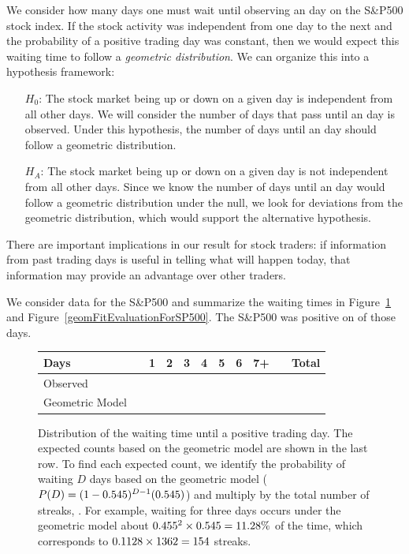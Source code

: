We consider how many days one must wait until observing an  day on the S\&P500 stock index. If the stock activity was independent from one day to the next and the probability of a positive trading day was constant, then we would expect this waiting time to follow a \emph{geometric distribution}. We can organize this into a hypothesis framework:
\begin{itemize}
\item[$H_0$:] The stock market being up or down on a given day is independent from all other days. We will consider the number of days that pass until an  day is observed. Under this hypothesis, the number of days until an  day should follow a geometric distribution.
\item[$H_A$:] The stock market being up or down on a given day is not independent from all other days. Since we know the number of days until an  day would follow a geometric distribution under the null, we look for deviations from the geometric distribution, which would support the alternative hypothesis.
\end{itemize}
There are important implications in our result for stock traders: if information from past trading days is useful in telling what will happen today, that information may provide an advantage over other traders.

We consider data for the S\&P500 and summarize the waiting times in Figure~\ref{sAndP500TimeToPosTrade2} and Figure~\ref{geomFitEvaluationForSP500}. The S\&P500 was positive on \spUpPerc{} of those days.

\begin{figure}
\centering
\begin{tabular}{ll ccc ccc c ll}
  \hline
  Days & \hspace{1mm} &
      1 & 2 & 3 & 4 & 5 & 6 & 7+ & \hspace{1mm} & Total \\
  \hline
  Observed & & \spdaysA{} & \spdaysB{} & \spdaysC{} &
      \spdaysD{} & \spdaysE{} & \spdaysF{} & \spdaysG{} & &
      \spdays{} \\
  Geometric Model & & \spdaysEA{} & \spdaysEB{} & \spdaysEC{} &
      \spdaysED{} & \spdaysEE{} & \spdaysEF{} & \spdaysEG{} & &
      \spdays{} \\
  \hline
\end{tabular}
\caption{Distribution of the waiting time until a positive
    trading day.
    The expected counts based on the geometric model are
    shown in the last row.
    To find each expected count, we identify the probability
    of waiting $D$ days based on the geometric model
    ($P(D) = (1-0.545{})^{D-1}(0.545{})$)
    and multiply by the total number of streaks, \spdays{}.
    For example, waiting for three days occurs under the
    geometric model about
    $0.455{}^2\times 0.545{} = 11.28\%{}$
    of the time, which corresponds to
    $0.1128{} \times 1362{} = 154$ streaks.}
\label{sAndP500TimeToPosTrade2}
\end{figure}

